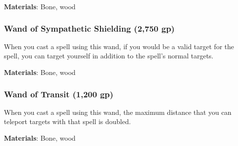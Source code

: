 \vspace{0.25em}
\textbf{Materials}: Bone, wood


\lowercase{\hypertarget{item:Wand of Sympathetic Shielding}{}}\label{item:Wand of Sympathetic Shielding}
\hypertarget{item:Wand of Sympathetic Shielding}{\subsubsection{Wand of Sympathetic Shielding\hfill{} (2,750 gp)}}

When you cast a   spell using this wand,
if you would be a valid target for the spell,
you can target yourself in addition to the spell's normal targets.



\vspace{0.25em}
\textbf{Materials}: Bone, wood


\lowercase{\hypertarget{item:Wand of Transit}{}}\label{item:Wand of Transit}
\hypertarget{item:Wand of Transit}{\subsubsection{Wand of Transit\hfill{} (1,200 gp)}}

When you cast a  spell using this wand,
the maximum distance that you can teleport targets with that spell is doubled.



\vspace{0.25em}
\textbf{Materials}: Bone, wood

